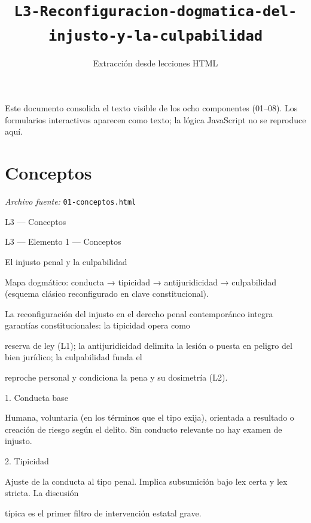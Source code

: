 \documentclass[11pt,a4paper]{article}
\title{\texttt{L3-Reconfiguracion-dogmatica-del-injusto-y-la-culpabilidad}}
\author{Extracci\'on desde lecciones HTML}
\date{}
\begin{document}
\maketitle

\begin{small}
\noindent Este documento consolida el texto visible de los ocho componentes (01--08). Los formularios interactivos aparecen como texto; la l\'ogica JavaScript no se reproduce aqu\'i.
\end{small}
\bigskip
\section{Conceptos}
\noindent\textit{Archivo fuente:} \texttt{01-conceptos.html}

L3 — Conceptos\par





    L3 — Elemento 1 — Conceptos\par
    El injusto penal y la culpabilidad\par

    Mapa dogmático: conducta → tipicidad → antijuridicidad → culpabilidad (esquema clásico reconfigurado en clave constitucional).\par


      La reconfiguración del injusto en el derecho penal contemporáneo integra garantías constitucionales: la tipicidad opera como\par
      reserva de ley (L1); la antijuridicidad delimita la lesión o puesta en peligro del bien jurídico; la culpabilidad funda el\par
      reproche personal y condiciona la pena y su dosimetría (L2).\par



      1. Conducta base\par

      Humana, voluntaria (en los términos que el tipo exija), orientada a resultado o creación de riesgo según el delito. Sin conducto relevante no hay examen de injusto.\par




      2. Tipicidad\par


        Ajuste de la conducta al tipo penal. Implica subsumición bajo lex certa y lex stricta. La discusión\par
        típica es el primer filtro de intervención estatal grave.\par
\end{document}
